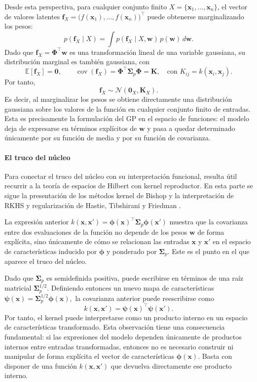 Desde esta perspectiva, para cualquier conjunto finito
\(X=\{\bm{x}_1,\dots,\bm{x}_n\}\), el vector de valores latentes
$
\bm{f}_X =
\bigl(f(\bm{x}_1),\dots,f(\bm{x}_n)\bigr)^\top
$
puede obtenerse marginalizando los pesos:
\[
p(\bm{f}_X\mid X)
=
\int p(\bm{f}_X\mid X,\bm{w})\,p(\bm{w})\,d\bm{w}.
\]
Dado que \(\bm{f}_X=\bm{\Phi}^\top \bm{w}\) es una transformación lineal de una variable
gaussiana, su distribución marginal es también gaussiana, con
\[
\mathbb{E}[\bm{f}_X]=\bm{0},
\qquad
\operatorname{cov}(\bm{f}_X)=\bm{\Phi}^\top \bm{\Sigma}_p \bm{\Phi}=\bm{K},
\quad \text{con } K_{ij}=k(\bm{x}_i,\bm{x}_j).
\]
Por tanto,
\[
\bm{f}_X \sim \mathcal{N}(\bm{0}_X,\bm{K}_X).
\]
Es decir, al marginalizar los pesos se obtiene directamente una distribución gaussiana sobre
los valores de la función en cualquier conjunto finito de entradas. Esta es precisamente la
formulación del GP en el espacio de funciones: el modelo deja de expresarse
en términos explícitos de \(\bm{w}\) y pasa a quedar determinado únicamente por su función
de media y por su función de covarianza.

\paragraph{El truco del núcleo}
\label{subsec:truco_del_kernel}

Para conectar el truco del núcleo con su interpretación funcional, resulta útil recurrir
a la teoría de espacios de Hilbert con kernel reproductor. En esta parte se sigue la
presentación de los métodos kernel de Bishop \cite{bishop2006prml} y la interpretación
de RKHS y regularización de Hastie, Tibshirani y Friedman \cite{hastie2009elements}.
\vspace{0.3cm}

La expresión anterior
\(
k(\bm{x},\bm{x}')
=
\bm{\phi}(\bm{x})^\top \bm{\Sigma}_p \bm{\phi}(\bm{x}')
\)
muestra que la covarianza entre dos evaluaciones de la función no depende de los pesos
\(\bm{w}\) de forma explícita, sino únicamente de cómo se relacionan las entradas
\(\bm{x}\) y \(\bm{x}'\) en el espacio de características inducido por \(\bm{\phi}\) y ponderado
por \(\bm{\Sigma}_p\). Este es el punto en el que aparece el truco del núcleo.

Dado que \(\bm{\Sigma}_p\) es semidefinida positiva, puede escribirse en términos de una raíz
matricial \(\bm{\Sigma}_p^{1/2}\). Definiendo entonces un nuevo mapa de características
$
\bm{\psi}(\bm{x})=\bm{\Sigma}_p^{1/2}\bm{\phi}(\bm{x}),
$
la covarianza anterior puede reescribirse como
\[
k(\bm{x},\bm{x}')
=
\bm{\psi}(\bm{x})^\top \bm{\psi}(\bm{x}').
\]
Por tanto, el kernel puede interpretarse como un producto interno en un espacio de
características transformado. Esta observación tiene una consecuencia fundamental: si las
expresiones del modelo dependen únicamente de productos internos entre entradas
transformadas, entonces no es necesario construir ni manipular de forma explícita el vector
de características \(\bm{\phi}(\bm{x})\). Basta con disponer de una función
\(k(\bm{x},\bm{x}')\) que devuelva directamente ese producto interno.

